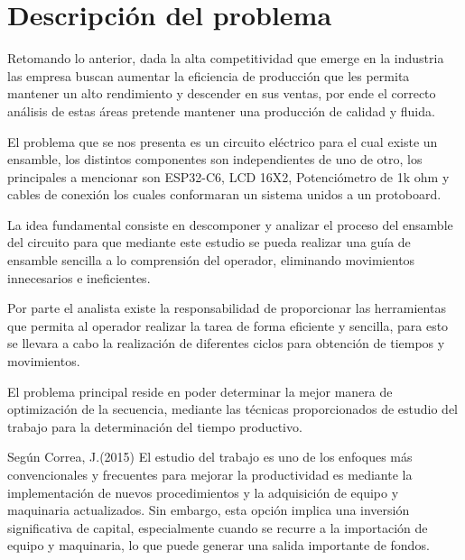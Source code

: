     \section{Descripción del problema}
    Retomando lo anterior, dada la alta competitividad que emerge en la industria las empresa buscan aumentar la eficiencia de producción que les permita mantener un alto rendimiento y descender en sus ventas, por ende el correcto análisis de estas áreas pretende mantener una producción de calidad y fluida.
    
    El problema que se nos presenta es un circuito eléctrico para el cual existe un ensamble, los distintos componentes son independientes de uno de otro, los principales a mencionar son ESP32-C6, LCD 16X2, Potenciómetro de 1k ohm y cables de conexión los cuales conformaran un sistema unidos a un protoboard.
    
    La idea fundamental consiste en descomponer y analizar el proceso del ensamble del circuito para que mediante este estudio se pueda realizar una guía de ensamble sencilla a lo comprensión del operador, eliminando movimientos innecesarios e ineficientes. 
    
    Por parte el analista existe la responsabilidad de proporcionar las herramientas  que permita al operador realizar la tarea de forma eficiente y sencilla, para esto se llevara a cabo la realización de diferentes ciclos para obtención de tiempos y movimientos.
    
    El problema principal reside en poder determinar la mejor manera de optimización de la secuencia, mediante las técnicas proporcionados de estudio del trabajo para la determinación del tiempo productivo. 
    
    Según Correa, J.(2015) El estudio del trabajo es uno de los enfoques más convencionales y frecuentes para mejorar la productividad es mediante la implementación de nuevos procedimientos y la adquisición de equipo y maquinaria actualizados. Sin embargo, esta opción implica una inversión significativa de capital, especialmente cuando se recurre a la importación de equipo y maquinaria, lo que puede generar una salida importante de fondos.\cite{REF6}
    
